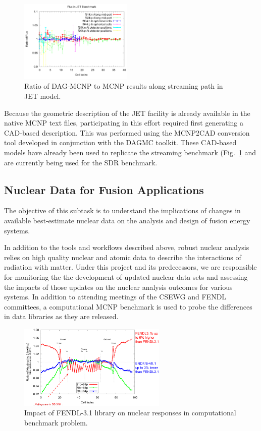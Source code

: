 \begin{figure}
\centering
\includegraphics[width=0.48\textwidth]{imgs/jet-streaming-benchmark.png}
\caption{\label{fig:jet-streaming-benchmark}Ratio of DAG-MCNP to MCNP results
  along streaming path in JET model.}
\end{figure}

Because the geometric description of the JET facility is already available in
the native MCNP text files, participating in this effort required first
generating a \gls{CAD}-based description.  This was performed using the
MCNP2CAD conversion tool developed in conjunction with the \gls{DAGMC}
toolkit.  These \gls{CAD}-based models have already been used to replicate the
streaming benchmark (Fig.\ \ref{fig:jet-streaming-benchmark} and are currently
being used for the \gls{SDR} benchmark.

\subsection{Nuclear Data for Fusion Applications}

The objective of this subtask is to understand the implications of changes in
available best-estimate nuclear data on the analysis and design of fusion
energy systems.

In addition to the tools and workflows described above, robust nuclear
analysis relies on high quality nuclear and atomic data to describe the
interactions of radiation with matter.  Under this project and its
predecessors, we are responsible for monitoring the the development of updated
nuclear data sets and assessing the impacts of those updates on the nuclear
analysis outcomes for various systems.  In addition to attending meetings of
the \gls{CSEWG} and \gls{FENDL} committees, a computational MCNP benchmark is
used to probe the differences in data libraries as they are released.

\begin{figure}
\centering
\includegraphics[width=0.63\textwidth]{imgs/fendl3.png}
\caption{\label{fig:fendl3_impact}Impact of FENDL-3.1 library on
  nuclear responses in computational benchmark problem.}
\end{figure}

